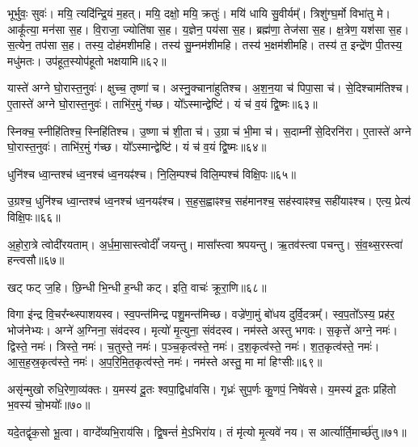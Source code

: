 भूर्भुवः॒ सुवः॑। 
मयि॒ त्यदि॑न्द्रि॒यं म॒हत्। 
मयि॒ दक्षो॒ मयि॒ क्रतुः॑। 
मयि॑ धायि सु॒वीर्यम्᳚। 
त्रिशु॑ग्घ॒र्मो विभा॑तु मे। 
आकू᳚त्या॒ मन॑सा स॒ह। 
वि॒राजा॒ ज्योति॑षा स॒ह। 
य॒ज्ञेन॒ पय॑सा स॒ह। 
ब्रह्म॑णा॒ तेज॑सा स॒ह। 
क्ष॒त्रेण॒ यश॑सा स॒ह। 
स॒त्येन॒ तप॑सा स॒ह। 
तस्य॒ दोह॑मशीमहि। 
तस्य॑ सु॒म्नम॑शीमहि। 
तस्य॑ भ॒क्षम॑शीमहि। 
तस्य॑ त॒ इन्द्रे॑ण पी॒तस्य॒ मधु॑मतः। 
उप॑हूत॒स्योप॑हूतो भक्षयामि॥६२॥
\anuvakamend[यश॑सा स॒ह षट्च॑]

यास्ते॑ अग्ने घो॒रास्त॒नुवः॑। 
क्षुच्च॒ तृष्णा॑ च। 
अस्नु॒क्चाना॑हुतिश्च। 
अ॒श॒न॒या च॑ पिपा॒सा च॑। 
से॒दिश्चाम॑तिश्च। 
ए॒तास्ते॑ अग्ने घो॒रास्त॒नुवः॑। 
ताभि॑र॒मुं ग॑च्छ। 
यो᳚ऽस्मान्द्वेष्टि॑। 
यं च॑ व॒यं द्वि॒ष्मः॥६३॥
\anuvakamend

स्निक्च॒ स्नीहि॑तिश्च॒ स्निहि॑तिश्च। 
उ॒ष्णा च॑ शी॒ता च॑। 
उ॒ग्रा च॑ भी॒मा च॑। 
स॒दाम्नी॑ से॒दिरनि॑रा। 
ए॒तास्ते॑ अग्ने घो॒रास्त॒नुवः॑। 
ताभि॑र॒मुं ग॑च्छ। 
यो᳚ऽस्मान्द्वेष्टि॑। 
यं च॑ व॒यं द्वि॒ष्मः॥६४॥
\anuvakamend

धुनि॑श्च ध्वा॒न्तश्च॑ ध्व॒नश्च॑ ध्व॒नयꣴ॑श्च। 
नि॒लि॒म्पश्च॑ विलि॒म्पश्च॑ विक्षि॒पः॥६५॥
\anuvakamend

उ॒ग्रश्च॒ धुनि॑श्च ध्वा॒न्तश्च॑ ध्व॒नश्च॑ ध्व॒नयꣴ॑श्च। 
स॒ह॒स॒ह्वाꣴश्च॒ सह॑मानश्च॒ सह॑स्वाꣴश्च॒ सही॑याꣴश्च। 
एत्य॒ प्रेत्य॑ विक्षि॒पः॥६६॥
\anuvakamend


अ॒हो॒रा॒त्रे त्वोदी॑रयताम्। 
अ॒र्ध॒मा॒सास्त्वोदीं᳚ जयन्तु। 
मासा᳚स्त्वा श्रपयन्तु। 
ऋ॒तव॑स्त्वा पचन्तु। 
सं॒व॒थ्स॒रस्त्वा॑ हन्त्वसौ॥६७॥
\anuvakamend

खट् फट् ज॒हि। 
छि॒न्धी भि॒न्धी ह॒न्धी कट्। 
इति॒ वाचः॑ क्रूरा॒णि॥६८॥
\anuvakamend

विगा इ॑न्द्र वि॒चर᳚न्थ्स्पाशयस्व। 
स्व॒पन्त॑मिन्द्र पशु॒मन्त॑मिच्छ। 
वज्रे॑णा॒मुं बो॑धय दुर्वि॒दत्रम्᳚। 
स्व॒प॒तो᳚ऽस्य॒ प्रह॑र॒ भोज॑नेभ्यः। 
अग्ने॑ अ॒ग्निना॒ संव॑दस्व। 
मृत्यो॑ मृ॒त्युना॒ संव॑दस्व। 
नम॑स्ते अस्तु भगवः। 
स॒कृत्ते॑ अग्ने॒ नमः॑। 
द्विस्ते॒ नमः॑। 
त्रिस्ते॒ नमः॑। 
च॒तुस्ते॒ नमः॑। 
प॒ञ्च॒कृत्व॑स्ते॒ नमः॑। 
द॒श॒कृत्व॑स्ते॒ नमः॑। 
श॒त॒कृत्व॑स्ते॒ नमः॑। 
आ॒स॒ह॒स्र॒कृत्व॑स्ते॒ नमः॑। 
अ॒प॒रि॒मि॒त॒कृत्व॑स्ते॒ नमः॑। 
नम॑स्ते अस्तु॒ मा मा॑ हिꣳसीः॥६९॥
\anuvakamend[त्रिस्ते॒ नमः॑ स॒प्त च॑]

असृ॑न्मुखो रुधि॒रेणा॒व्य॑क्तः। 
य॒मस्य॑ दू॒तः  श्वपा॒द्विधा॑वसि। 
गृध्रः॑ सुप॒र्णः कु॒णपं॒ निषे॑वसे। 
य॒मस्य॑ दू॒तः प्रहि॑तो भ॒वस्य॑ चो॒भयोः᳚॥७०॥
\anuvakamend

यदे॒तद्वृ॑क॒सो भू॒त्वा। 
वाग्दे᳚व्यभि॒राय॑सि। 
द्वि॒षन्तं॑ मे॒ऽभिरा॑य। 
तं मृ॑त्यो मृ॒त्यवे॑ नय। 
स आर्त्यार्ति॒मार्च्छ॑तु॥७१॥%
\anuvakamend

